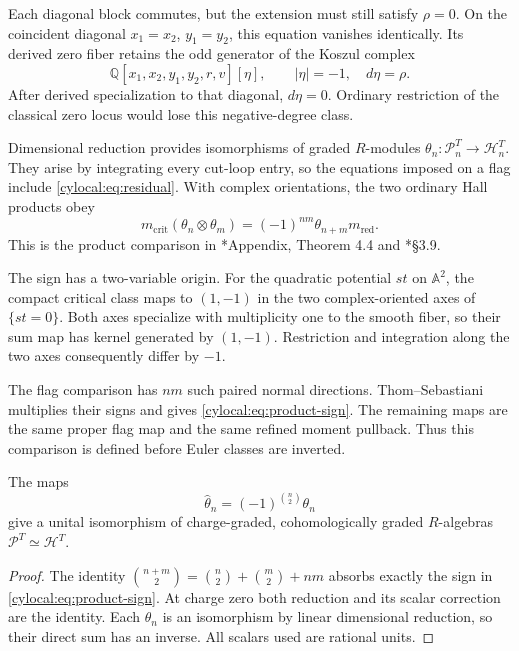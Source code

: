 Each diagonal block commutes, but the extension must still satisfy
$\rho=0$. On the coincident diagonal $x_1=x_2$, $y_1=y_2$, this
equation vanishes identically. Its derived zero fiber retains the
odd generator of the Koszul complex
\[
 \mathbb Q[x_1,x_2,y_1,y_2,r,v][\eta],
 \qquad |\eta|=-1,\quad d\eta=\rho.
\]
After derived specialization to that diagonal, $d\eta=0$.
Ordinary restriction of the classical zero locus would lose this
negative-degree class.

Dimensional reduction provides isomorphisms of graded $R$-modules
$\theta_n:\mathcal P_n^T\to\mathcal H_n^T$. They arise by
integrating every cut-loop entry, so the equations imposed on a flag
include \eqref{cylocal:eq:residual}. With complex orientations, the
two ordinary Hall products obey
\begin{equation}\label{cylocal:eq:product-sign}
 m_{\mathrm{crit}}(\theta_n\otimes\theta_m)
   =(-1)^{nm}\theta_{n+m}m_{\mathrm{red}}.
\end{equation}
This is the product comparison in
\cite{cylocal:RS}*{Appendix, Theorem 4.4} and
\cite{cylocal:Davison}*{\S3.9}.

The sign has a two-variable origin. For the quadratic potential
$st$ on $\mathbb A^2$, the compact critical class maps to
$(1,-1)$ in the two complex-oriented axes of $\{st=0\}$.
Both axes specialize with multiplicity one to the smooth fiber,
so their sum map has kernel generated by $(1,-1)$.
Restriction and integration along the two axes consequently differ
by $-1$.

The flag comparison has $nm$ such paired normal directions.
Thom--Sebastiani multiplies their signs and gives
\eqref{cylocal:eq:product-sign}. The remaining maps are the same
proper flag map and the same refined moment pullback. Thus this
comparison is defined before Euler classes are inverted.

\begin{proposition}\label{cylocal:prop:integral-reduction}
The maps
\[
 \widehat\theta_n=(-1)^{\binom n2}\theta_n
\]
give a unital isomorphism of charge-graded, cohomologically graded
$R$-algebras $\mathcal P^T\simeq\mathcal H^T$.
\end{proposition}
\begin{proof}
The identity
$\binom{n+m}{2}=\binom n2+\binom m2+nm$ absorbs exactly the sign
in \eqref{cylocal:eq:product-sign}. At charge zero both reduction
and its scalar correction are the identity. Each $\theta_n$ is an
isomorphism by linear dimensional reduction, so their direct sum
has an inverse. All scalars used are rational units.
\end{proof}

